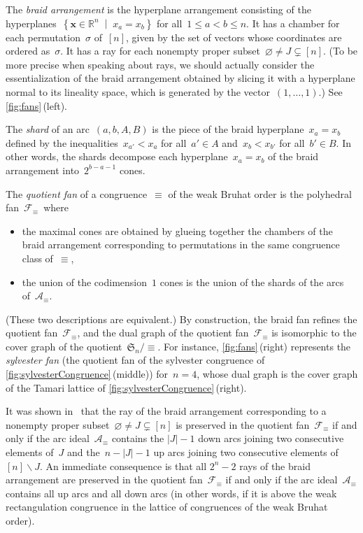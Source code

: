\documentclass{amsart}
\theoremstyle{definition}
\newcommand{\R}{\mathbb{R}} %
\renewcommand{\c}[1]{\mathcal{#1}} %
\renewcommand{\b}[1]{{\boldsymbol{#1}}} %
\newcommand{\f}[1]{\mathfrak{#1}} %
\newcommand{\set}[2]{\left\{ #1 \;\middle|\; #2 \right\}} %
\newcommand{\ssm}{\smallsetminus} %
\newcommand{\eqdef}{\mbox{\,\raisebox{0.2ex}{\scriptsize\ensuremath{\mathrm:}}\ensuremath{=}\,}} %
\newcommand{\darkblue}{\color{darkblue}} %
\newcommand{\defn}[1]{\textsl{\darkblue #1}} %
\begin{document}
The \defn{braid arrangement} is the hyperplane arrangement consisting of the hyperplanes~$\set{\b{x} \in \R^n}{x_a = x_b}$ for all~$1 \le a < b \le n$.
It has a chamber for each permutation~$\sigma$ of~$[n]$, given by the set of vectors whose coordinates are ordered as~$\sigma$.
It has a ray for each nonempty proper subset~$\varnothing \ne J \subsetneq [n]$.
(To be more precise when speaking about rays, we should actually consider the essentialization of the braid arrangement obtained by slicing it with a hyperplane normal to its lineality space, which is generated by the vector~$(1, \dots, 1)$.)
See \cref{fig:fans}\,(left).

The \defn{shard} of an arc~$(a, b, A, B)$ is the piece of the braid hyperplane~${x_a = x_b}$ defined by the inequalities~$x_{a'} < x_a$ for all~$a' \in A$ and~$x_b < x_{b'}$ for all~$b' \in B$.
In other words, the shards decompose each hyperplane~$x_a = x_b$ of the braid arrangement into~$2^{b-a-1}$ cones.

The \defn{quotient fan} of a congruence~$\equiv$ of the weak Bruhat order is the polyhedral fan~$\c{F}_\equiv$~where
\begin{itemize}
\item the maximal cones are obtained by glueing together the chambers of the braid arrangement corresponding to permutations in the same congruence class of~$\equiv$,
\item the union of the codimension~$1$ cones is the union of the shards of the arcs of~$\c{A}_\equiv$.
\end{itemize}
(These two descriptions are equivalent.)
By construction, the braid fan refines the quotient fan~$\c{F}_\equiv$, and the dual graph of the quotient fan~$\c{F}_\equiv$ is isomorphic to the cover graph of the quotient~$\f{S}_n/{\equiv}$.
For instance, \cref{fig:fans}\,(right) represents the \defn{sylvester fan} (the quotient fan of the sylvester congruence of \cref{fig:sylvesterCongruence}\,(middle)) for~$n = 4$, whose dual graph is the cover graph of the Tamari lattice of \cref{fig:sylvesterCongruence}\,(right).

It was shown in~\cite[Lem.~23]{MR4328906} that the ray of the braid arrangement corresponding to a nonempty proper subset~$\varnothing \ne J \subsetneq [n]$ is preserved in the quotient fan~$\c{F}_\equiv$ if and only if the arc ideal~$\c{A}_\equiv$ contains the $|J|-1$ down arcs joining two consecutive elements of~$J$ and the~$n-|J|-1$ up arcs joining two consecutive elements of~$[n] \ssm J$.
An immediate consequence is that all $2^n-2$ rays of the braid arrangement are preserved in the quotient fan~$\c{F}_\equiv$ if and only if the arc ideal~$\c{A}_\equiv$ contains all up arcs and all down arcs (in other words, if it is above the weak rectangulation congruence in the lattice of congruences of the weak Bruhat order).
\end{document}
